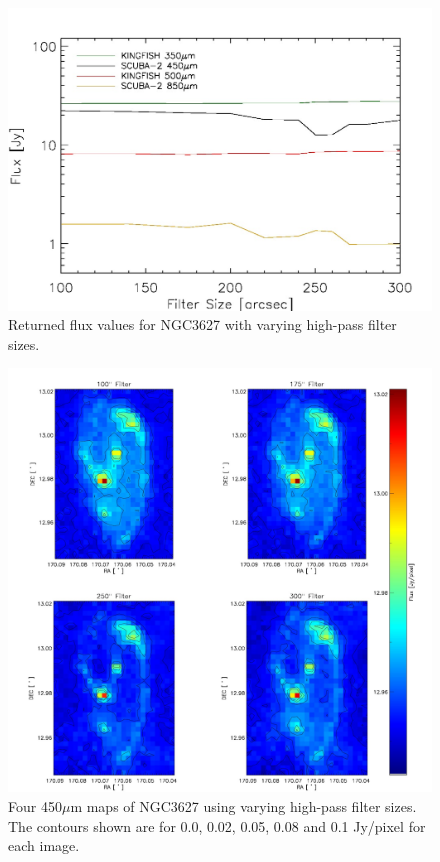 \begin{figure}
  \centering
  \includegraphics[scale=0.65]{obs_imgs/flux_line.jpeg}
  \caption[Flux Values vs  High-Pass Filter Sizes]{Returned flux values for NGC3627 with varying high-pass filter sizes.}
  \label{fig:filt_lines}
\end{figure}

\begin{figure}
  \centering
  \includegraphics[scale=0.5]{obs_imgs/450_comparison_4.jpeg}
  \caption[450$\mu$m High-Pass Filter Images]{Four 450$\mu$m maps of NGC3627 using varying high-pass filter sizes.  The contours shown are for 0.0, 0.02, 0.05, 0.08 and 0.1 Jy/pixel for each image.}
  \label{fig:450_flt}
\end{figure}

